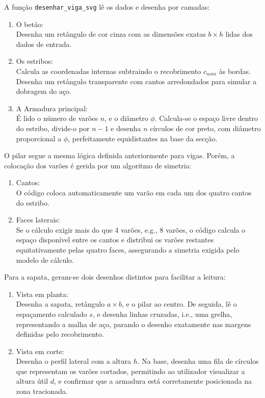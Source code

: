 {
A função \texttt{desenhar\_viga\_svg} lê os dados e desenha por camadas:
\begin{enumerate}
    \item O betão:\\
    Desenha um retângulo de cor cinza com as dimensões exatas $b \times h$ lidas dos dados de entrada.
    \item Os estribos:\\
    Calcula as coordenadas internas subtraindo o recobrimento $c_{nom}$ às bordas. Desenha um retângulo transparente com cantos arredondados para simular a dobragem do aço.
    \item A Armadura principal:\\
    É lido o número de varões $n$, e o diâmetro $\phi$. Calcula-se o espaço livre dentro do estribo, divide-o por $n-1$ e desenha $n$ círculos de cor preto, com diâmetro proporcional a $\phi$, perfeitamente equidistantes na base da secção.
\end{enumerate}

O pilar segue a mesma lógica definida anteriormente para vigas. Porém, a colocação dos varões é gerida por um algoritmo de simetria:
\begin{enumerate}
    \item Cantos:\\
    O código coloca automaticamente um varão em cada um dos quatro cantos do estribo.
    \item Faces laterais:\\
    Se o cálculo exigir mais do que 4 varões, e.g., 8 varões, o código calcula o espaço disponível entre os cantos e distribui os varões restantes equitativamente pelas quatro faces, assegurando a simetria exigida pelo modelo de cálculo.
\end{enumerate}

Para a sapata, geram-se dois desenhos distintos para facilitar a leitura:
\begin{enumerate}
    \item Vista em planta:\\
    Desenha a sapata, retângulo $a \times b$, e o pilar ao centro. De seguida, lê o espaçamento calculado $s$, e desenha linhas cruzadas, i.e., uma grelha, representando a malha de aço, parando o desenho exatamente nas margens definidas pelo recobrimento.
    \item Vista em corte:\\
    Desenha o perfil lateral com a altura $h$. Na base, desenha uma fila de círculos que representam os varões cortados, permitindo ao utilizador visualizar a altura útil $d$, e confirmar que a armadura está corretamente posicionada na zona tracionada.
\end{enumerate}

}
